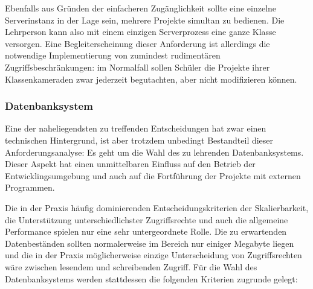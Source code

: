 Ebenfalls aus Gründen der einfacheren Zugänglichkeit sollte eine einzelne Serverinstanz in der Lage sein, mehrere Projekte simultan zu bedienen. Die Lehrperson kann also mit einem einzigen Serverprozess eine ganze Klasse versorgen. Eine Begleiterscheinung dieser Anforderung ist allerdings die notwendige Implementierung von zumindest rudimentären Zugriffsbeschränkungen: im Normalfall sollen Schüler die Projekte ihrer Klassenkameraden zwar jederzeit begutachten, aber nicht modifizieren können.

\subsubsection{Datenbanksystem}

Eine der naheliegendsten zu treffenden Entscheidungen hat zwar einen technischen Hintergrund, ist aber trotzdem unbedingt Bestandteil dieser Anforderungsanalyse: Es geht um die Wahl des zu lehrenden Datenbanksystems. Dieser Aspekt hat einen unmittelbaren Einfluss auf den Betrieb der Entwicklingsumgebung und auch auf die Fortführung der Projekte mit externen Programmen.

Die in der Praxis häufig dominierenden Entscheidungskriterien der Skalierbarkeit, die Unterstützung unterschiedlichster Zugriffsrechte und auch die allgemeine Performance spielen nur eine sehr untergeordnete Rolle. Die zu erwartenden Datenbeständen sollten normalerweise im Bereich nur einiger Megabyte liegen und die in der Praxis möglicherweise einzige Unterscheidung von Zugriffsrechten wäre zwischen lesendem und schreibenden Zugriff. Für die Wahl des Datenbanksystems werden stattdessen die folgenden Kriterien zugrunde gelegt:

